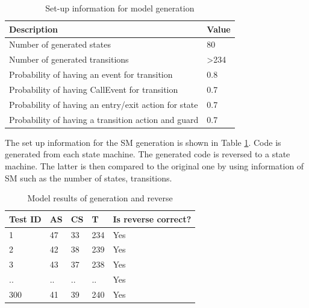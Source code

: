 \begin{table}
\centering
\caption{Set-up information for model generation}
\label{table:setup}
\begin{tabular}{|l|l|}
\hline
Description                                     & Value            \\ \hline
Number of generated states                      & 80               \\ \hline
Number of generated transitions                 & \textgreater 234 \\ \hline
Probability of having an event for transition   & 0.8              \\ \hline
Probability of having CallEvent for transition  & 0.7              \\ \hline
Probability of having an entry/exit action for state & 0.7              \\ \hline
Probability of having a transition action and guard       & 0.7              \\ \hline
\end{tabular}
\end{table}

The set up information for the SM generation is shown in Table \ref{table:setup}. Code is generated from each state machine. The generated code is reversed to a state machine. The latter is then compared to the original one by using information of SM such as the number of states, transitions. 

\begin{table}
\centering
\caption{Model results of generation and reverse}
\label{table:law1-resultat}
\begin{tabular}{|l|l|l|l|l|}
\hline
Test ID & AS & CS & T & Is reverse correct? \\ \hline
1       & 47 & 33 & 234 & Yes                 \\ \hline
2       & 42 & 38 & 239 & Yes                 \\ \hline
3       & 43 & 37 & 238 & Yes                 \\ \hline
..      & .. & .. & .. & Yes                 \\ \hline
300       & 41 & 39 &240 & Yes                 \\ \hline
\end{tabular}
\end{table}
 
